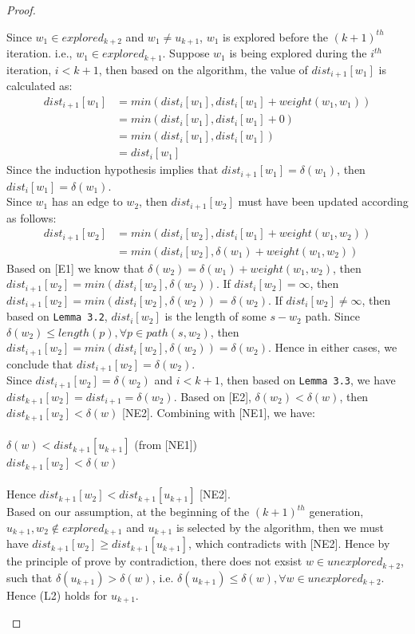\documentclass[11pt, oneside]{article}   	%
\newcommand\ftab[1][5cm]{\hspace*{#1}}
\theoremstyle{definition}
\begin{document}
\begin{proof}
\begin{itemize}
\begin{enumerate}
  Since $w_1 \in explored_{k+2}$ and $w_1 \neq u_{k+1}$, $w_1$ is explored before the $(k+1)^{th}$ iteration. i.e., $w_1 \in explored_{k+1}$. Suppose $w_1$ is being explored during the $i^{th}$ iteration, $i < k+1$, then based on the algorithm, the value of $dist_{i+1}[w_1]$ is calculated as: 
  \begin{align*}
        dist_{i+1}[w_1] &= min(dist_{i}[w_1], dist_{i}[w_1] + weight(w_1,w_1)) \\
                        &= min(dist_{i}[w_1], dist_{i}[w_1] + 0)\\
                        &= min(dist_{i}[w_1], dist_{i}[w_1])\\
                        &= dist_{i}[w_1]
  \end{align*}
  Since the induction hypothesis implies that $dist_{i+1}[w_1] = \delta(w_1)$, then $dist_i[w_1] = \delta(w_1)$. 
  \\
  Since $w_1$ has an edge to $w_2$, then $dist_{i+1}[w_2]$ must have been updated according as follows: 
  \begin{align*}
     dist_{i+1}[w_2] &= min(dist_i[w_2], dist_i[w_1] + weight(w_1,w_2)) \\
                     &= min(dist_i[w_2], \delta(w_1) + weight(w_1, w_2))
  \end{align*}
  Based on [E1] we know that $\delta(w_2) =  \delta(w_1) + weight(w_1, w_2)$, then $dist_{i+1}[w_2] = min(dist_i[w_2], \delta(w_2))$. If $dist_i[w_2] = \infty$, then $dist_{i+1}[w_2] = min(dist_i[w_2], \delta(w_2)) = \delta(w_2)$. If $dist_i[w_2] \neq \infty$, then based on \texttt{Lemma 3.2}, $dist_i[w_2]$ is the length of some $s-w_2$ path. Since $\delta(w_2) \leq length(p), \forall p \in path(s, w_2)$, then $dist_{i+1}[w_2] = min(dist_i[w_2], \delta(w_2)) = \delta(w_2)$. Hence in either cases, we conclude that $dist_{i+1}[w_2] = \delta(w_2)$. 
  \\
  Since $dist_{i+1}[w_2] = \delta(w_2)$ and $i < k+1$, then based on \texttt{Lemma 3.3}, we have $dist_{k+1}[w_2] = dist_{i+1} = \delta(w_2)$. Based on [E2], $\delta(w_2) < \delta(w)$, then $dist_{k+1}[w_2] < \delta(w)$ [NE2]. Combining with [NE1], we have: 
  \\\\
  \ftab $\delta(w) < dist_{k+1}[u_{k+1}]$ (from [NE1])\\
  \ftab $dist_{k+1}[w_2] < \delta(w)$ 
  \\\\
  Hence $dist_{k+1}[w_2] < dist_{k+1}[u_{k+1}]$ [NE2]. 
  \\
  Based on our assumption, at the beginning of the $(k+1)^{th}$ generation, $u_{k+1}, w_2 \notin explored_{k+1}$ and $u_{k+1}$ is selected by the algorithm, then we must have $dist_{k+1}[w_2] \geq dist_{k+1}[u_{k+1}]$, which contradicts with [NE2]. Hence by the principle of prove by contradiction, there does not exsist $w \in unexplored_{k+2}$, such that $\delta(u_{k+1}) > \delta(w)$, i.e. $\delta(u_{k+1}) \leq \delta(w), \forall w \in unexplored_{k+2}$. Hence (L2) holds for $u_{k+1}$. 
  \\



\end{enumerate}
\end{itemize}
\end{proof}
\end{document}
